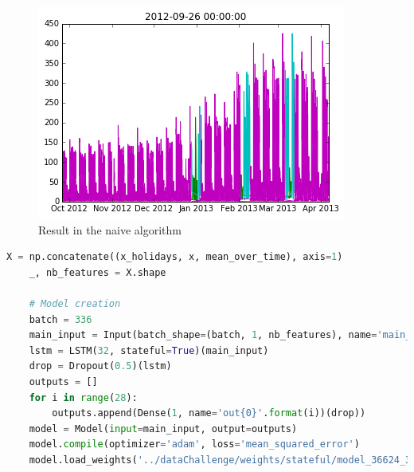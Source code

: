 \begin{appendices}
  \begin{figure}[H]
  \center
  \includegraphics[scale=0.7]{img/res_naive.png}
  \caption{Result in the naive algorithm}
  \label{res_naive}
  \end{figure}

  \begin{lstlisting}[caption=Create the recurrent neural network with 28 outputs, label={RNN}, language=python]
    X = np.concatenate((x_holidays, x, mean_over_time), axis=1)
    _, nb_features = X.shape

    # Model creation
    batch = 336
    main_input = Input(batch_shape=(batch, 1, nb_features), name='main_input')
    lstm = LSTM(32, stateful=True)(main_input)
    drop = Dropout(0.5)(lstm)
    outputs = []
    for i in range(28):
        outputs.append(Dense(1, name='out{0}'.format(i))(drop))
    model = Model(input=main_input, output=outputs)
    model.compile(optimizer='adam', loss='mean_squared_error')
    model.load_weights('../dataChallenge/weights/stateful/model_36624_36959_loss_2.5011280818.h5')
  \end{lstlisting}

  \label{bestmodel}




\end{appendices}
